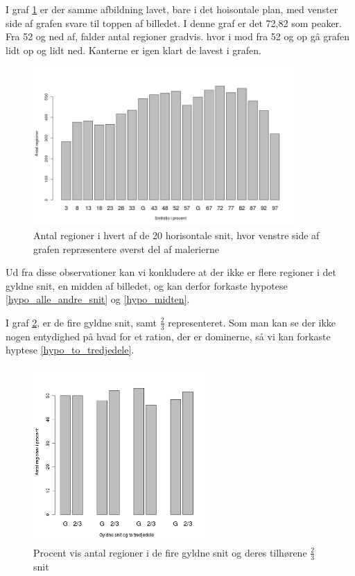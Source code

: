 {I graf \ref{antal_regioner_horisontale_cut_udvidet} er der samme
afbildning lavet, bare i det hoisontale plan, med venster side af grafen
svare til toppen af billedet. I denne graf er det 72,82 som peaker. Fra
52 og ned af, falder antal regioner gradvis. hvor i mod fra 52 og op gå
grafen lidt op og lidt ned. Kanterne er igen klart de lavest i grafen.

\begin{figure}[h!]
	\begin{center}
		\includegraphics[width=0.9\textwidth]{afsnit/resultater/billeder/cut2cut3eatsperratioU.png}
	\end{center}
	\caption{Antal regioner i hvert af de 20 horisontale snit, hvor venstre side af grafen repræsentere øverst del af malerierne}
	\label{antal_regioner_horisontale_cut_udvidet}
\end{figure}

Ud fra disse observationer kan vi konkludere at der ikke er flere
regioner i det gyldne snit, en midden af billedet, og kan derfor
forkaste hypotese \ref{hypo_alle_andre_snit} og \ref{hypo_midten}.

I graf \ref{G_vs_to_trejedele_udvidet}, er de fire gyldne snit, samt
$\frac{2}{3}$ representeret. Som man kan se der ikke nogen entydighed på
hvad for et ration, der er dominerne, så vi kan forkaste hyptese
\ref{hypo_to_tredjedele}.

\begin{figure}[h!]
	\begin{center}
		\includegraphics[width=0.6\textwidth]{afsnit/resultater/billeder/G_vs_to_tredjedeleU.png}
	\end{center}
	\caption{Procent vis antal regioner i de fire gyldne snit og deres tilhørene $\frac{2}{3}$ snit}
	\label{G_vs_to_trejedele_udvidet}
\end{figure}

}
